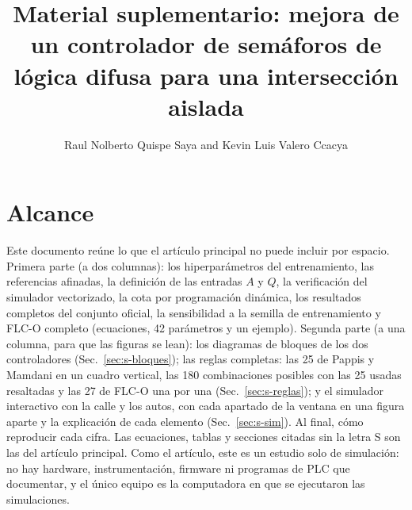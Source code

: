 \documentclass[journal]{IEEEtran}
\begin{document}
\title{Material suplementario: mejora de un controlador de semáforos de lógica difusa para una intersección aislada}
\author{Raul Nolberto Quispe Saya and Kevin Luis Valero Ccacya}
\maketitle

\section{Alcance}
Este documento reúne lo que el artículo principal no puede incluir por espacio. Primera parte (a dos columnas): los hiperparámetros del entrenamiento, las referencias afinadas, la definición de las entradas $A$ y $Q$, la verificación del simulador vectorizado, la cota por programación dinámica, los resultados completos del conjunto oficial, la sensibilidad a la semilla de entrenamiento y FLC-O completo (ecuaciones, 42 parámetros y un ejemplo). Segunda parte (a una columna, para que las figuras se lean): los diagramas de bloques de los dos controladores (Sec.~\ref{sec:s-bloques}); las reglas completas: las 25 de Pappis y Mamdani en un cuadro vertical, las 180 combinaciones posibles con las 25 usadas resaltadas y las 27 de FLC-O una por una (Sec.~\ref{sec:s-reglas}); y el simulador interactivo con la calle y los autos, con cada apartado de la ventana en una figura aparte y la explicación de cada elemento (Sec.~\ref{sec:s-sim}). Al final, cómo reproducir cada cifra. Las ecuaciones, tablas y secciones citadas sin la letra S son las del artículo principal. Como el artículo, este es un estudio solo de simulación: no hay hardware, instrumentación, firmware ni programas de PLC que documentar, y el único equipo es la computadora en que se ejecutaron las simulaciones.
\end{document}

